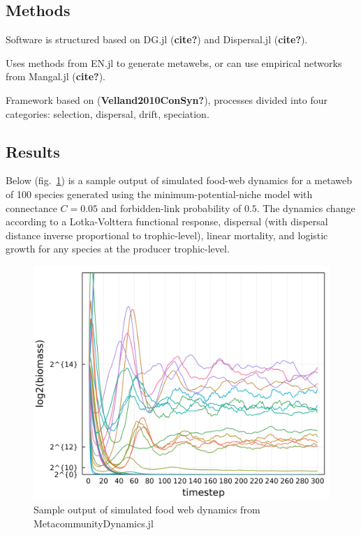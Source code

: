 \documentclass[10pt,oneside]{article}
\makeatletter
\def\maxwidth{\ifdim\Gin@nat@width>\linewidth\linewidth
\else\Gin@nat@width\fi}
\let\Oldincludegraphics\includegraphics
\renewcommand{\includegraphics}[1]{\Oldincludegraphics[width=\maxwidth]{#1}}
\makeatother
\begin{document}
\hypertarget{methods-3}{%
\subsection{Methods}\label{methods-3}}

Software is structured based on DG.jl (\textbf{cite?}) and Dispersal.jl
(\textbf{cite?}).

Uses methods from EN.jl to generate metawebs, or can use empirical
networks from Mangal.jl (\textbf{cite?}).

Framework based on (\textbf{Velland2010ConSyn?}), processes divided into
four categories: selection, dispersal, drift, speciation.

\hypertarget{results-3}{%
\subsection{Results}\label{results-3}}

Below (fig.~\ref{fig:foodwebtraj}) is a sample output of simulated
food-web dynamics for a metaweb of 100 species generated using the
minimum-potential-niche model with connectance \(C=0.05\) and
forbidden-link probability of \(0.5\). The dynamics change according to
a Lotka-Volttera functional response, dispersal (with dispersal distance
inverse proportional to trophic-level), linear mortality, and logistic
growth for any species at the producer trophic-level.

\begin{figure}
\hypertarget{fig:foodwebtraj}{%
\centering
\includegraphics{./figures/foodwebtraj.png}
\caption{Sample output of simulated food web dynamics from
MetacommunityDynamics.jl}\label{fig:foodwebtraj}
}
\end{figure}
\end{document}
